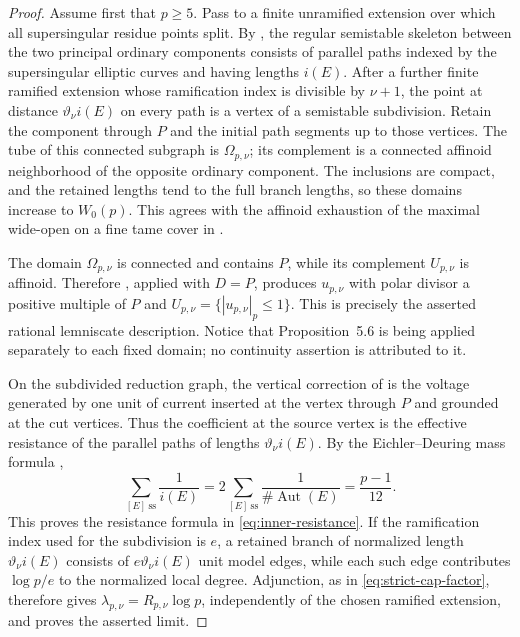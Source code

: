 \documentclass[11pt]{article}
\theoremstyle{definition}
\theoremstyle{remark}
\begin{document}
\begin{proof}
Assume first that $p\ge5$.  Pass to a finite unramified extension over which
all supersingular residue points split.  By
\cite[\S2, citing Deligne--Rapoport VI.6.16]{ColemanMcMurdy2006}, the regular
semistable skeleton between the two principal ordinary components consists of
parallel paths indexed by the supersingular elliptic curves and having lengths
$i(E)$.  After a further finite ramified extension whose ramification index is
divisible by $\nu+1$, the point at distance $\vartheta_\nu i(E)$ on every
path is a vertex of a semistable subdivision.  Retain the component through
$P$ and the initial path segments up to those vertices.  The tube of this
connected subgraph is $\Omega_{p,\nu}$; its complement is a connected affinoid
neighborhood of the opposite ordinary component.  The inclusions are compact,
and the retained lengths tend to the full branch lengths, so these domains
increase to $W_0(p)$.  This agrees with the affinoid exhaustion of the maximal
wide-open on a fine tame cover in \cite[Proposition~4.1]{Buzzard2003}.

The domain $\Omega_{p,\nu}$ is connected and contains $P$, while its complement
$U_{p,\nu}$ is affinoid.  Therefore
\cite[Proposition~5.6]{BostChambertLoir2009}, applied with $D=P$, produces
$u_{p,\nu}$ with polar divisor a positive multiple of $P$ and
$U_{p,\nu}=\{|u_{p,\nu}|_p\le1\}$.  This is precisely the asserted rational
lemniscate description.  Notice that Proposition~5.6 is being applied
separately to each fixed domain; no continuity assertion is attributed to it.

On the subdivided reduction graph, the vertical correction of
\cite[Proposition~5.1]{BostChambertLoir2009} is the voltage generated by one
unit of current inserted at the vertex through $P$ and grounded at the cut
vertices.  Thus the coefficient at the source vertex is the effective
resistance of the parallel paths of lengths $\vartheta_\nu i(E)$.  By the
Eichler--Deuring mass formula \cite[\S5,\S10]{Deuring1941},
\[
 \sum_{[E]\ \mathrm{ss}}\frac1{i(E)}
 =2\sum_{[E]\ \mathrm{ss}}
   \frac1{\#\operatorname{Aut}(E)}
 =\frac{p-1}{12}.
\]
This proves the resistance formula in \eqref{eq:inner-resistance}.  If the
ramification index used for the subdivision is $e$, a retained branch of
normalized length $\vartheta_\nu i(E)$ consists of
$e\vartheta_\nu i(E)$ unit model edges, while each such edge contributes
$\log p/e$ to the normalized local degree.  Adjunction, as in
\eqref{eq:strict-cap-factor}, therefore gives
$\lambda_{p,\nu}=R_{p,\nu}\log p$, independently of the chosen
ramified extension, and proves the asserted limit.


\end{proof}
\end{document}
